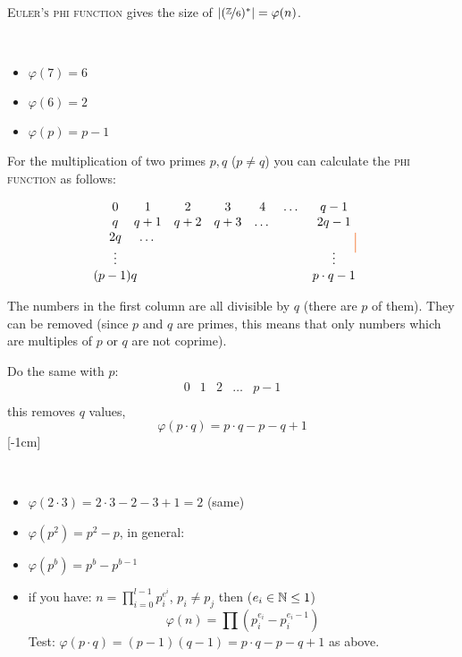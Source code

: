 \textsc{Euler's phi function} gives the size of $|(\nicefrac{\mathbb{Z}}{6})^{\ast}| = \varphi(n)$.

\begin{example}\ \\
\begin{itemize}
\item $\varphi(7) = 6$
\item $\varphi(6) = 2$
\item $\varphi(p) = p-1$
\end{itemize}
\end{example}

For the multiplication of two primes $p, q$ ($p \neq q$) you can calculate the \textsc{phi function} as follows:

\[
	\begin{matrix}
  \tikzmark{top}{0} & 1 & 2 & 3 & 4 & \dots & q-1 \\
  q & q+1 & q+2 & q+3 & \dots & & 2q-1 \\
  2q & \dots & & & & & \\
  \vdots & & & & & & \vdots \\
  \tikzmark{bottom}{(p-1)q} &  &  &  &  & & p \cdot q-1 \\
 \end{matrix}
 \DrawLine[ocre, thick, opacity = 0.7]{top}{bottom}
\]


The numbers in the first column are all divisible by $q$ (there are $p$ of them). They can be removed (since $p$ and $q$ are primes, this means that only numbers which are multiples of $p$ or $q$ are not coprime).

Do the same with $p$:
\[
\begin{matrix}
	0 & 1 & 2 & \dots & p-1 \\
\end{matrix}
\]
this removes $q$ values,
\[
\varphi(p \cdot q) = p \cdot q - p - q + 1
\]
[-1cm]

\begin{example} \ \\
\begin{itemize}
\item $\varphi (2 \cdot 3) = 2 \cdot 3 - 2 - 3 + 1 = 2$ (same)
\item $\varphi (p^2) = p^2 - p$, in general:
\item $\varphi (p^b) = p^b - p^{b-1}$
\item if you have: $n = \prod\limits_{i=0}^{l-1} p_i^{e^i}$, $p_i \neq p_j$ then ($e_i \in \mathbb{N} \leq 1$)
\[
\varphi(n) = \prod(p_i^{e_i} - p_i^{e_i - 1})
\]
Test: $\varphi(p \cdot q) = (p-1)(q-1) = p \cdot q - p - q + 1$ as above.
\end{itemize}
\end{example}

